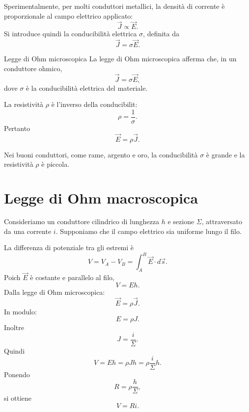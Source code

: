 \documentclass[a4paper]{article}
\begin{document}
Sperimentalmente, per molti conduttori metallici, la densità di corrente è proporzionale al campo elettrico applicato:
\[
    \vec{J}\propto\vec{E}.
\]
Si introduce quindi la conducibilità elettrica \(\sigma\), definita da
\[
    \vec{J}=\sigma\vec{E}.
\]

\begin{snippetdefinition}{Legge di Ohm microscopica}
    La legge di Ohm microscopica afferma che, in un conduttore ohmico,
    \[
        \vec{J}=\sigma\vec{E},
    \]
    dove \(\sigma\) è la conducibilità elettrica del materiale.
\end{snippetdefinition}

La resistività \(\rho\) è l'inverso della conducibilit:
\[
    \rho=\frac{1}{\sigma}.
\]
Pertanto
\[
    \vec{E}=\rho\vec{J}.
\]

Nei buoni conduttori, come rame, argento e oro, la conducibilità \(\sigma\) è grande e la resistività \(\rho\) è piccola.

\section{Legge di Ohm macroscopica}

Consideriamo un conduttore cilindrico di lunghezza \(h\) e sezione \(\Sigma\), attraversato da una corrente \(i\). Supponiamo che il campo elettrico sia uniforme lungo il filo.

\begin{center}
\end{center}

La differenza di potenziale tra gli estremi è
\[
    V=V_A-V_B=\int_A^B\vec{E}\cdot d\vec{s}.
\]
Poich \(\vec{E}\) è costante e parallelo al filo,
\[
    V=Eh.
\]
Dalla legge di Ohm microscopica:
\[
    \vec{E}=\rho\vec{J}.
\]
In modulo:
\[
    E=\rho J.
\]
Inoltre
\[
    J=\frac{i}{\Sigma}.
\]
Quindi
\[
    V=Eh=\rho Jh=\rho\frac{i}{\Sigma}h.
\]
Ponendo
\[
    R=\rho\frac{h}{\Sigma},
\]
si ottiene
\[
    V=Ri.
\]
\end{document}
